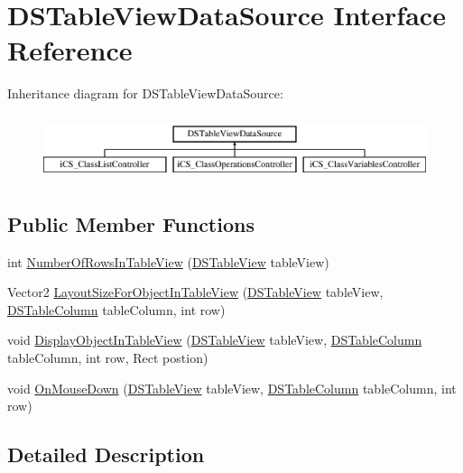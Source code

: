 \hypertarget{interface_d_s_table_view_data_source}{\section{D\+S\+Table\+View\+Data\+Source Interface Reference}
\label{interface_d_s_table_view_data_source}
}
Inheritance diagram for D\+S\+Table\+View\+Data\+Source\+:\begin{figure}[H]
\begin{center}
\leavevmode
\includegraphics[height=1.904762cm]{interface_d_s_table_view_data_source}
\end{center}
\end{figure}
\subsection*{Public Member Functions}
\begin{DoxyCompactItemize}
\item 
int \hyperlink{interface_d_s_table_view_data_source_a7566beb4845270e06611144b6c7357a0}{Number\+Of\+Rows\+In\+Table\+View} (\hyperlink{class_d_s_table_view}{D\+S\+Table\+View} table\+View)
\item 
Vector2 \hyperlink{interface_d_s_table_view_data_source_a80d4e441c66eee45f94f0a1877b4cf1f}{Layout\+Size\+For\+Object\+In\+Table\+View} (\hyperlink{class_d_s_table_view}{D\+S\+Table\+View} table\+View, \hyperlink{class_d_s_table_column}{D\+S\+Table\+Column} table\+Column, int row)
\item 
void \hyperlink{interface_d_s_table_view_data_source_a9da994983f5f04762e2e8b957d37d2a2}{Display\+Object\+In\+Table\+View} (\hyperlink{class_d_s_table_view}{D\+S\+Table\+View} table\+View, \hyperlink{class_d_s_table_column}{D\+S\+Table\+Column} table\+Column, int row, Rect postion)
\item 
void \hyperlink{interface_d_s_table_view_data_source_a7d1aee71e3dd3201fcb66a94b6a1511e}{On\+Mouse\+Down} (\hyperlink{class_d_s_table_view}{D\+S\+Table\+View} table\+View, \hyperlink{class_d_s_table_column}{D\+S\+Table\+Column} table\+Column, int row)
\end{DoxyCompactItemize}


\subsection{Detailed Description}


